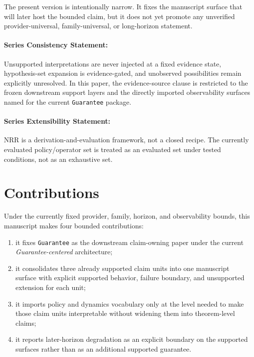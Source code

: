 \documentclass[11pt]{article}
\begin{document}
The present version is intentionally narrow. It fixes the manuscript surface that
will later host the bounded claim, but it does not yet promote any unverified
provider-universal, family-universal, or long-horizon statement.

\paragraph{Series Consistency Statement:}
Unsupported interpretations are never injected at a fixed evidence state,
hypothesis-set expansion is evidence-gated, and unobserved possibilities remain
explicitly unresolved. In this paper, the evidence-source clause is restricted to
the frozen downstream support layers and the directly imported observability
surfaces named for the current \texttt{Guarantee} package.

\paragraph{Series Extensibility Statement:}
NRR is a derivation-and-evaluation framework, not a closed recipe. The currently
evaluated policy/operator set is treated as an evaluated set under tested
conditions, not as an exhaustive set.

\section{Contributions}

Under the currently fixed provider, family, horizon, and observability bounds,
this manuscript makes four bounded contributions:

\begin{enumerate}
\item it fixes \texttt{Guarantee} as the downstream claim-owning paper under the
current \textit{Guarantee-centered} architecture;
\item it consolidates three already supported claim units into one manuscript
surface with explicit supported behavior, failure boundary, and unsupported
extension for each unit;
\item it imports policy and dynamics vocabulary only at the level needed to make
those claim units interpretable without widening them into theorem-level claims;
\item it reports later-horizon degradation as an explicit boundary on the
supported surfaces rather than as an additional supported guarantee.
\end{enumerate}
\end{document}
